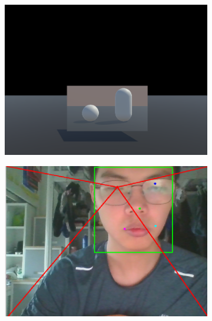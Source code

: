 \begin{figure}
    \centering
    \begin{subfigure}[t]{0.45\linewidth}
        \centering
        \includegraphics[width=1\textwidth]{figures/Implementation/illusion_1.png}
    \end{subfigure}
    \begin{subfigure}[t]{0.45\linewidth}
        \centering
        \includegraphics[width=1\textwidth]{figures/Implementation/illusion_1_face.png}
    \end{subfigure}
    \begin{subfigure}[t]{0.45\linewidth}
        \centering

\end{subfigure}
\end{figure}
